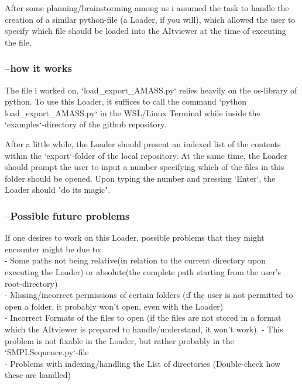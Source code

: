\documentclass[a4paper]{scrartcl}
\begin{document}
\quad After some planning/brainstorming among us i assumed the task to handle the creation of a similar python-file (a Loader, if you will), which allowed the user to specify which file should be loaded into the AItviewer at the time of executing the file.

\subsubsection*{--how it works}
\quad The file i worked on, `load\_export\_AMASS.py` relies heavily on the os-library of python.
To use this Loader, it suffices to call the command `python load\_export\_AMASS.py` in the WSL/Linux Terminal while inside the `examples`-directory of the github repository.


\quad After a little while, the Loader should present an indexed list of the contents within the `export`-folder of the local repository. At the same time, the Loader should prompt the user to input a number specifying which of the files in this folder should be opened. Upon typing the number and pressing `Enter`, the Loader should "do its magic".

\subsubsection*{--Possible future problems}
If one desires to work on this Loader, possible problems that they might encounter might be due to:\\
- Some paths not being relative(in relation to the current directory upon executing the Loader) or absolute(the complete path starting from the user's root-directory)\\
- Missing/incorrect permissions of certain folders (if the user is not permitted to open a folder, it probably won't open, even with the Loader)\\
- Incorrect Formats of the files to open (if the files are not stored in a format which the AItviewer is prepared to handle/understand, it won't work). - This problem is not fixable in the Loader, but rather probably in the `SMPLSequence.py`-file\\
- Problems with indexing/handling the List of directories (Double-check how these are handled)\\
\end{document}
